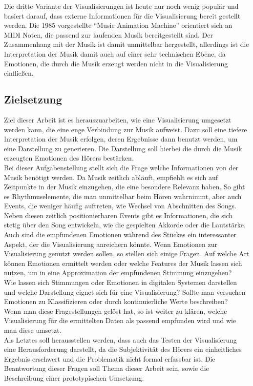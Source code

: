 \documentclass[11pt,a4paper]{article}
\begin{document}
Die dritte Variante der Visualisierungen ist heute nur noch wenig populär und basiert darauf, dass externe Informationen für die Visualisierung bereit gestellt werden. Die 1985 vorgestellte ``Music Animation Machine'' orientiert sich an MIDI Noten, die passend zur laufenden Musik bereitgestellt sind. Der Zusammenhang mit der Musik ist damit unmittelbar hergestellt, allerdings ist die Interpretation der Musik damit auch auf einer sehr technischen Ebene, da Emotionen, die durch die Musik erzeugt werden nicht in die Visualisierung einfließen.\\

\subsection{Zielsetzung}
Ziel dieser Arbeit ist es herauszuarbeiten, wie eine Visualisierung umgesetzt werden kann, die eine enge Verbindung zur Musik aufweist. Dazu soll eine tiefere Interpretation der Musik erfolgen, deren Ergebnisse dann benutzt werden, um eine Darstellung zu generieren. Die Darstellung soll hierbei die durch die Musik erzeugten Emotionen des Hörers bestärken.\\
Bei dieser Aufgabenstellung stellt sich die Frage welche Informationen von der Musik benötigt werden. Da Musik zeitlich abläuft, empfiehlt es sich auf Zeitpunkte in der Musik einzugehen, die eine besondere Relevanz haben. So gibt es Rhythmuselemente, die man unmittelbar beim Hören wahrnimmt, aber auch Events, die weniger häufig auftreten, wie Wechsel von Abschnitten des Songs. Neben diesen zeitlich positionierbaren Events gibt es Informationen, die sich stetig über den Song entwickeln, wie die gespielten Akkorde oder die Lautstärke.\\
Auch sind die empfundenen Emotionen während des Stückes ein interessanter Aspekt, der die Visualisierung anreichern könnte.
Wenn Emotionen zur Visualisierung genutzt werden sollen, so stellen sich einige Fragen. Auf welche Art können Emotionen ermittelt werden oder welche Features der Musik lassen sich nutzen, um in eine Approximation der empfundenen Stimmung einzugehen?\\
Wie lassen sich Stimmungen oder Emotionen in digitalen Systemen darstellen und welche Darstellung eignet sich für eine Visualisierung? Sollte man versuchen Emotionen zu Klassifizieren oder durch kontinuierliche Werte beschreiben?\\
Wenn man diese Fragestellungen gelöst hat, so ist weiter zu klären, welche Visualisierung für die ermittelten Daten als passend empfunden wird und wie man diese umsetzt.\\
Als Letztes soll herausstellen werden, dass auch das Testen der Visualisierung eine Herausforderung darstellt, da die Subjektivität des Hörers ein einheitliches Ergebnis erschwert und die Problematik nicht formal erfassbar ist. Die Beantwortung dieser Fragen soll Thema dieser Arbeit sein, sowie die Beschreibung einer prototypischen Umsetzung.
\end{document}
